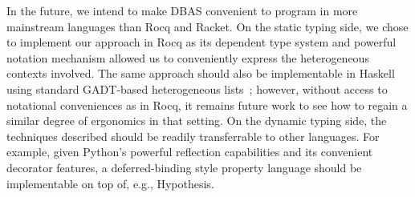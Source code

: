 In the future, we intend to make DBAS convenient to program in more mainstream
languages than Rocq and Racket. On the static typing side, we chose to implement our
approach in Rocq as its dependent type system and powerful notation mechanism allowed
us to conveniently express the heterogeneous contexts involved. The same approach
should also be implementable in Haskell using standard GADT-based heterogeneous
lists~\cite{HaskellPromotion}; however, without access to notational conveniences as in
Rocq, it remains future work to see how to regain a similar degree of ergonomics in
that setting. On the dynamic typing side, the techniques described should be readily
transferrable to other languages. For example, given Python's powerful reflection
capabilities and its convenient decorator features, a deferred-binding style property
language should be implementable on top of, e.g., Hypothesis.
